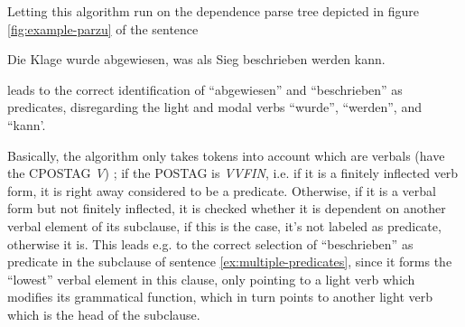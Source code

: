 Letting this algorithm run on the dependence parse tree depicted in figure \ref{fig:example-parzu}
of the sentence

\begin{examples}
	\item \label{ex:multiple-predicates} Die Klage wurde abgewiesen, was als Sieg beschrieben werden kann.
\end{examples}

leads to the correct identification of ``abgewiesen'' and ``beschrieben'' as predicates,
disregarding the light and modal verbs ``wurde'', ``werden'', and ``kann'.


Basically, the algorithm only takes tokens into account which are verbals (have the CPOSTAG
\emph{V}) ; if the POSTAG is \emph{VVFIN}, i.e. if it is a finitely inflected verb form,
it is right away considered to be a predicate. Otherwise, if it is a verbal form but not
finitely inflected, it is checked whether it is dependent on another verbal element of its
subclause, if this is the case, it's not labeled as predicate, otherwise it is. This leads
e.g. to the correct selection of ``beschrieben'' as predicate in the subclause of sentence
\ref{ex:multiple-predicates}, since it forms the ``lowest'' verbal element in this clause,
only pointing to a light verb which modifies its grammatical function, which in turn points
to another light verb which is the head of the subclause.


